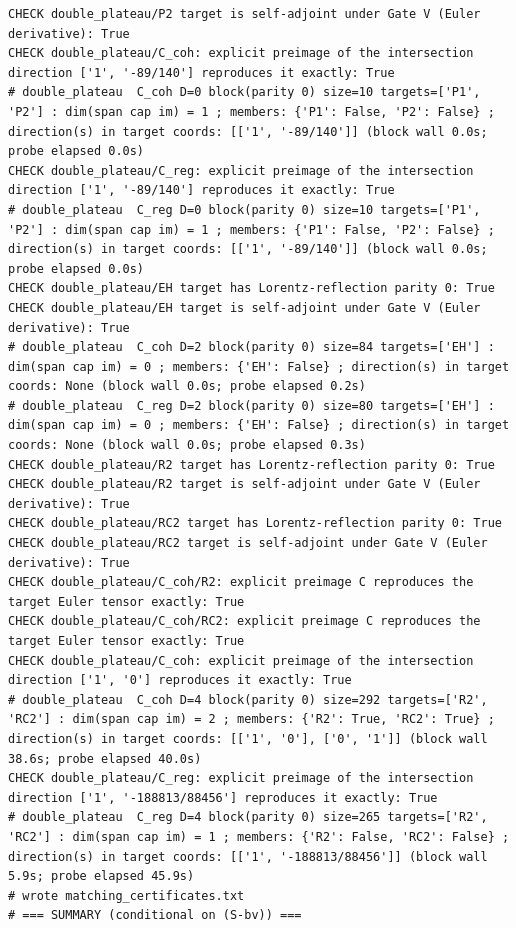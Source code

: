 \documentclass{article}
\theoremstyle{remark}
\begin{document}
\begin{lstlisting}
CHECK double_plateau/P2 target is self-adjoint under Gate V (Euler derivative): True
CHECK double_plateau/C_coh: explicit preimage of the intersection direction ['1', '-89/140'] reproduces it exactly: True
# double_plateau  C_coh D=0 block(parity 0) size=10 targets=['P1', 'P2'] : dim(span cap im) = 1 ; members: {'P1': False, 'P2': False} ; direction(s) in target coords: [['1', '-89/140']] (block wall 0.0s; probe elapsed 0.0s)
CHECK double_plateau/C_reg: explicit preimage of the intersection direction ['1', '-89/140'] reproduces it exactly: True
# double_plateau  C_reg D=0 block(parity 0) size=10 targets=['P1', 'P2'] : dim(span cap im) = 1 ; members: {'P1': False, 'P2': False} ; direction(s) in target coords: [['1', '-89/140']] (block wall 0.0s; probe elapsed 0.0s)
CHECK double_plateau/EH target has Lorentz-reflection parity 0: True
CHECK double_plateau/EH target is self-adjoint under Gate V (Euler derivative): True
# double_plateau  C_coh D=2 block(parity 0) size=84 targets=['EH'] : dim(span cap im) = 0 ; members: {'EH': False} ; direction(s) in target coords: None (block wall 0.0s; probe elapsed 0.2s)
# double_plateau  C_reg D=2 block(parity 0) size=80 targets=['EH'] : dim(span cap im) = 0 ; members: {'EH': False} ; direction(s) in target coords: None (block wall 0.0s; probe elapsed 0.3s)
CHECK double_plateau/R2 target has Lorentz-reflection parity 0: True
CHECK double_plateau/R2 target is self-adjoint under Gate V (Euler derivative): True
CHECK double_plateau/RC2 target has Lorentz-reflection parity 0: True
CHECK double_plateau/RC2 target is self-adjoint under Gate V (Euler derivative): True
CHECK double_plateau/C_coh/R2: explicit preimage C reproduces the target Euler tensor exactly: True
CHECK double_plateau/C_coh/RC2: explicit preimage C reproduces the target Euler tensor exactly: True
CHECK double_plateau/C_coh: explicit preimage of the intersection direction ['1', '0'] reproduces it exactly: True
# double_plateau  C_coh D=4 block(parity 0) size=292 targets=['R2', 'RC2'] : dim(span cap im) = 2 ; members: {'R2': True, 'RC2': True} ; direction(s) in target coords: [['1', '0'], ['0', '1']] (block wall 38.6s; probe elapsed 40.0s)
CHECK double_plateau/C_reg: explicit preimage of the intersection direction ['1', '-188813/88456'] reproduces it exactly: True
# double_plateau  C_reg D=4 block(parity 0) size=265 targets=['R2', 'RC2'] : dim(span cap im) = 1 ; members: {'R2': False, 'RC2': False} ; direction(s) in target coords: [['1', '-188813/88456']] (block wall 5.9s; probe elapsed 45.9s)
# wrote matching_certificates.txt
# === SUMMARY (conditional on (S-bv)) ===

\end{lstlisting}
\end{document}
